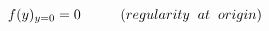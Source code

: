 \begin{equation} %
f(y)_{y=0}=0 \hspace{1cm} (regularity \hspace{0.2cm}at\hspace{0.2cm} origin)
\end{equation}

